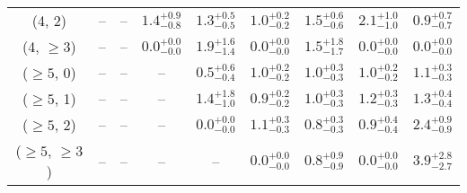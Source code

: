 \begin{table}[h!]
{\begin{tabular}{ccccccccc}
	(4, 2) & -- & -- & $1.4^{+ 0.9 }_{- 0.8 }$ & $1.3^{+ 0.5 }_{- 0.5 }$ & $1.0^{+ 0.2 }_{- 0.2 }$ & $1.5^{+ 0.6 }_{- 0.6 }$ & $2.1^{+ 1.0 }_{- 1.0 }$ & $0.9^{+ 0.7 }_{- 0.7 }$ \\[0.5ex] 
	(4, $\ge3$) & -- & -- & $0.0^{+ 0.0 }_{- 0.0 }$ & $1.9^{+ 1.6 }_{- 1.4 }$ & $0.0^{+ 0.0 }_{- 0.0 }$ & $1.5^{+ 1.8 }_{- 1.7 }$ & $0.0^{+ 0.0 }_{- 0.0 }$ & $0.0^{+ 0.0 }_{- 0.0 }$ \\[0.5ex] 
	($\ge5$, 0) & -- & -- & -- & $0.5^{+ 0.6 }_{- 0.4 }$ & $1.0^{+ 0.2 }_{- 0.2 }$ & $1.0^{+ 0.3 }_{- 0.3 }$ & $1.0^{+ 0.2 }_{- 0.2 }$ & $1.1^{+ 0.3 }_{- 0.3 }$ \\[0.5ex] 
	($\ge5$, 1) & -- & -- & -- & $1.4^{+ 1.8 }_{- 1.0 }$ & $0.9^{+ 0.2 }_{- 0.2 }$ & $1.0^{+ 0.3 }_{- 0.3 }$ & $1.2^{+ 0.3 }_{- 0.3 }$ & $1.3^{+ 0.4 }_{- 0.4 }$ \\[0.5ex] 
	($\ge5$, 2) & -- & -- & -- & $0.0^{+ 0.0 }_{- 0.0 }$ & $1.1^{+ 0.3 }_{- 0.3 }$ & $0.8^{+ 0.3 }_{- 0.3 }$ & $0.9^{+ 0.4 }_{- 0.4 }$ & $2.4^{+ 0.9 }_{- 0.9 }$ \\[0.5ex] 
	($\ge5$, $\ge3$) & -- & -- & -- & -- & $0.0^{+ 0.0 }_{- 0.0 }$ & $0.8^{+ 0.9 }_{- 0.9 }$ & $0.0^{+ 0.0 }_{- 0.0 }$ & $3.9^{+ 2.8 }_{- 2.7 }$ \\[0.5ex] 
	\hline
	\hline
\end{tabular}}
\end{table}
